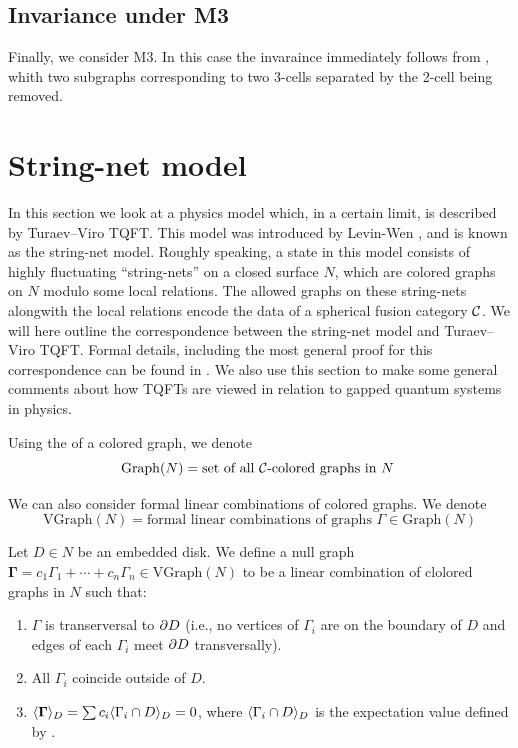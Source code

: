 \subsection*{Invariance under M3}
Finally, we consider M3. In this case the invaraince immediately follows
from , whith  two subgraphs corresponding to two 3-cells
separated by the 2-cell being removed.


\section{String-net model}\label{s:stringnet}


In this section we look at a physics model which, in a certain limit, is described 
by Turaev--Viro TQFT. This model was introduced  by Levin-Wen , 
and is known as the string-net model. Roughly speaking, a state in this model
consists of highly fluctuating ``string-nets'' on a closed surface $N$, which are  
colored graphs on $N$ modulo some local relations. The allowed graphs
on these string-nets alongwith the local relations encode the data of a spherical
fusion category $\mathcal{C}$.  We will here outline the correspondence between the string-net
 model and Turaev--Viro TQFT. Formal details, including the most
general proof for this correspondence can be found in . 
We also use this section to make some general comments about how TQFTs are viewed
in relation to gapped quantum systems in physics.


Using the  of a colored graph, we denote
  $$
\mathrm{Graph}(N)=\text{set of all $\mathcal{C}$-colored graphs in $N$ }
$$

We can also consider formal linear combinations of colored graphs. 
We denote
 $$
\mathrm{VGraph}(N)=\text{formal linear combinations of graphs }\Gamma \in \mathrm{Graph}(N) 
$$

\begin{definition}\label{d:null-graph}
	Let $D \in N$ be an embedded disk. We define a null graph $\boldsymbol{\Gamma} = c_1 \Gamma_1 + \cdots + c_n \Gamma_n 
	\in \mathrm{VGraph}(N)$ to be a linear combination of clolored graphs in $N$ such that:
	\begin{enumerate}
		\item $\Gamma$ is transerversal to $\partial D$ (i.e., no vertices of $\Gamma_i$ are on the boundary 
		of $D$ and edges of each $\Gamma_i$ meet $\partial D$ transversally).
		\item  All $\Gamma_i$ coincide outside of $D$.
		\item $\langle \boldsymbol{\Gamma} \rangle_D = \sum c_i \langle \Gamma_i \cap D \rangle_D =0$, where 
		$ \langle \Gamma_i \cap D \rangle_D$ is the expectation value defined by .
	\end{enumerate}
\end{definition}

